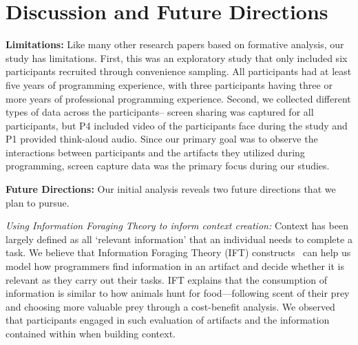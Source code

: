 
\section{Discussion and Future Directions}
\textbf{Limitations:} Like many other research papers based on formative analysis, our study has limitations. First, this was an exploratory study that only included six participants recruited through convenience sampling. All participants had at least five years of programming experience, with three participants having three or more years of professional programming experience. Second, we collected different types of data across the participants-- screen sharing was captured for all participants, but P4 included video of the participants face during the study and P1 provided think-aloud audio. Since our primary goal was to observe the interactions between participants and the artifacts they utilized during programming, screen capture data was the primary focus during our studies. 



\textbf{Future Directions:}
Our initial analysis reveals two future directions that we plan to pursue. 


\textit{Using Information Foraging Theory to inform context creation:}
Context has been largely defined as all `relevant information' that an individual needs to complete a task. We believe that Information Foraging Theory (IFT) constructs~\cite{Pirolli:1995,Fleming:2013} can help us model how programmers find information in an artifact and decide whether it is relevant as they carry out their tasks. IFT explains that the consumption of information is similar to how animals hunt for food---following scent of their prey and choosing more valuable prey through a cost-benefit analysis. We observed that participants engaged in such evaluation of artifacts and the information contained within when building context. 

